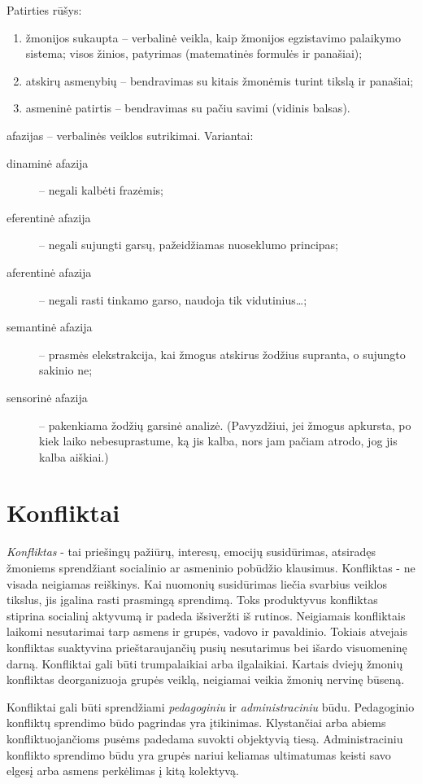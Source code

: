 Patirties rūšys:
\begin{enumerate}
  \item žmonijos sukaupta – verbalinė veikla, kaip žmonijos egzistavimo 
    palaikymo sistema; visos žinios, patyrimas (matematinės formulės
    ir panašiai);
  \item atskirų asmenybių – bendravimas su kitais žmonėmis turint tikslą
    ir panašiai;
  \item asmeninė patirtis – bendravimas su pačiu savimi (vidinis balsas).
\end{enumerate}

\Glspl{afazija} – verbalinės veiklos sutrikimai. Variantai:
\begin{description}
  \item[dinaminė afazija] – negali kalbėti frazėmis;
  \item[eferentinė afazija] – negali sujungti garsų, pažeidžiamas nuoseklumo
    principas;
  \item[aferentinė afazija] – negali rasti tinkamo garso, naudoja tik
    vidutinius…; %
  \item[semantinė afazija]  – prasmės elekstrakcija, 
    kai žmogus atskirus žodžius supranta, o sujungto sakinio ne;
  \item[sensorinė afazija] – pakenkiama žodžių garsinė analizė. (Pavyzdžiui,
    jei žmogus apkursta, po kiek laiko nebesuprastume, ką jis kalba, nors
    jam pačiam atrodo, jog jis kalba aiškiai.)
\end{description}

\section{Konfliktai}

\label{tema:konfliktai}

\emph{Konfliktas} - tai priešingų pažiūrų, interesų, emocijų susidūrimas, 
atsiradęs žmoniems sprendžiant socialinio ar asmeninio pobūdžio klausimus.
Konfliktas - ne visada neigiamas reiškinys. Kai nuomonių susidūrimas liečia 
svarbius veiklos tikslus, jis įgalina rasti prasmingą sprendimą. Toks 
produktyvus konfliktas stiprina socialinį aktyvumą ir padeda išsiveržti iš
rutinos. Neigiamais konfliktais laikomi nesutarimai tarp asmens ir grupės,
vadovo ir pavaldinio. Tokiais atvejais konfliktas suaktyvina prieštaraujančių
pusių nesutarimus bei išardo visuomeninę darną. Konfliktai gali būti
trumpalaikiai arba ilgalaikiai. Kartais dviejų žmonių konfliktas 
deorganizuoja grupės veiklą, neigiamai veikia žmonių nervinę būseną.

Konfliktai gali būti sprendžiami \emph{pedagoginiu} ir \emph{administraciniu}
būdu. Pedagoginio konfliktų sprendimo būdo pagrindas yra įtikinimas. 
Klystančiai arba abiems konfliktuojančioms pusėms padedama suvokti
objektyvią tiesą. Administraciniu konflikto sprendimo būdu yra grupės
nariui keliamas ultimatumas keisti savo elgesį arba asmens perkėlimas į
kitą kolektyvą.
